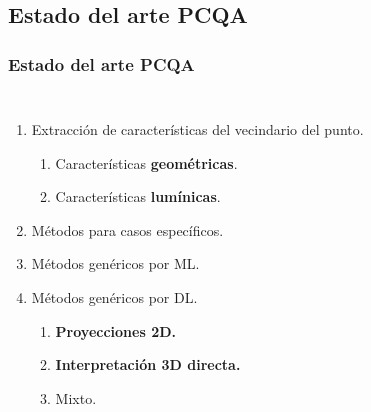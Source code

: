 \subsection{Estado del arte PCQA}
\begin{frame}
  \frametitle{Estado del arte PCQA}
  \begin{columns}
    \begin{enumerate}[<+->]
      \item Extracción de características del vecindario del punto.
        \begin{enumerate}
          \item Características \textbf{geométricas}.
          \item Características \textbf{lumínicas}.
        \end{enumerate}
      \item Métodos para casos específicos. 
      \item Métodos genéricos por ML. 
      \item Métodos genéricos por DL.
        \begin{enumerate}
          \item \textbf{Proyecciones 2D.}
          \item \textbf{Interpretación 3D directa.}
          \item Mixto.
        \end{enumerate}
    \end{enumerate}


\end{columns}
\end{frame}
